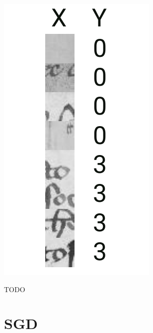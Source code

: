 \begin{marginfigure}
    \includegraphics[width=\textwidth]{figures/tasks/chen_examples.pdf}
    \caption{TODO}
    \label{fig:chen:cnn_task}
\end{marginfigure}
\section{SGD}

